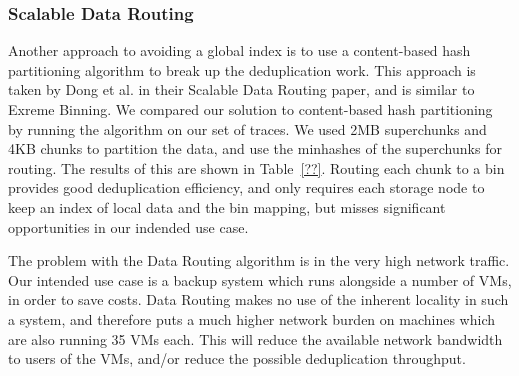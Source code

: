 {\subsubsection{Scalable Data Routing}
Another approach to avoiding a global index is to use a content-based hash
partitioning algorithm to break up the deduplication work. This approach is
taken by Dong et al. in their Scalable Data Routing paper, and is similar to
Exreme Binning\cite{??}\cite{extreme_binning09}. We compared our solution to
content-based hash partitioning by running the algorithm on our set of 
traces. We used 2MB superchunks and 4KB chunks to partition the data, and use
the minhashes of the superchunks for routing. The results of this are shown in
Table~\ref{??}. Routing each chunk to a bin provides good deduplication
efficiency, and only requires each storage node to keep an index of local data
and the bin mapping, but misses significant opportunities in our indended use
case.

The problem with the Data Routing algorithm is in the very high network traffic.
Our intended use case is a backup system which runs alongside a number of VMs,
in order to save costs. Data Routing makes no use of the inherent locality in
such a system, and therefore puts a much higher network burden on machines which
are also running 35 VMs each. This will reduce the available network bandwidth
to users of the VMs, and/or reduce the possible deduplication throughput.

}
